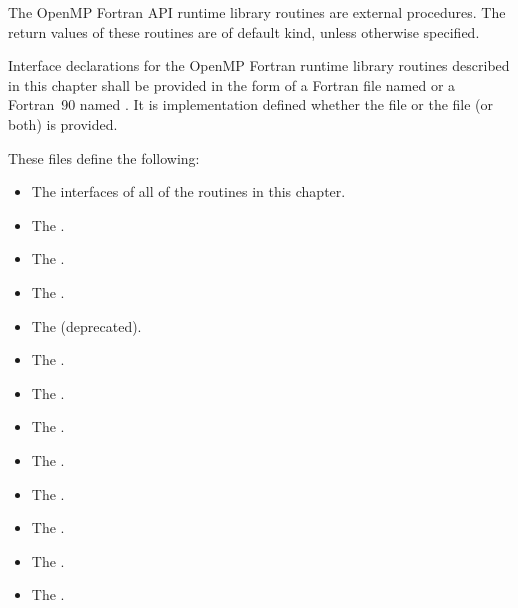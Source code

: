 \begin{fortranspecific}
The OpenMP Fortran API runtime library routines are external procedures. The return
values of these routines are of default kind, unless otherwise specified.

Interface declarations for the OpenMP Fortran runtime library routines described in this
chapter shall be provided in the form of a Fortran  file named  or
a Fortran~90  named . It is implementation defined whether the
 file or the  file (or both) is provided.

These files define the following:

\begin{itemize}
\item The interfaces of all of the routines in this chapter.

\item The   .

\item The   .

\item The   .

\item The    (deprecated).

\item The   .

\item The   .

\item The   .

\item The   .

\item The   .

\item The   .

\item The   .

\item The   .


\end{itemize}
\end{fortranspecific}
